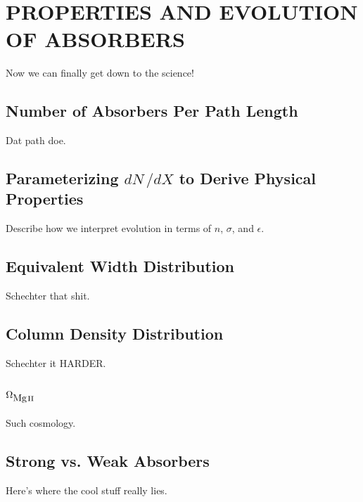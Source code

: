 \section{\MakeUppercase{Properties and Evolution of {\MgII} Absorbers}}
\label{ch5}

Now we can finally get down to the science!

\subsection{Number of Absorbers Per Path Length}
\label{ch5:dndx}

Dat path doe.

\subsection{Parameterizing $dN\,/dX$ to Derive Physical Properties}
\label{ch5:parameterize}

Describe how we interpret evolution in terms of $n$, $\sigma$, and $\epsilon$.

\subsection{Equivalent Width Distribution}
\label{ch5:ewdistro}

Schechter that shit.

\subsection{Column Density Distribution}
\label{ch5:columndistro}

Schechter it HARDER.

\subsection{$\Omega_{\hbox{{\rm Mg}\kern 0.1em{\sc ii}}}$}
\label{ch5:omega}

Such cosmology.

\subsection{Strong vs. Weak Absorbers}
\label{ch5:strongweak}

Here's where the cool stuff really lies.
